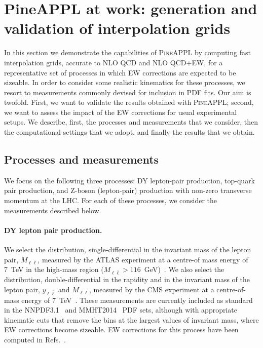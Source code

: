 \section{PineAPPL at work: generation and validation of interpolation grids}
\label{sec:results}

In this section we demonstrate the capabilities of \textsc{PineAPPL} by
computing fast interpolation grids, accurate to NLO QCD and NLO QCD+EW,
for a representative set of processes in which EW corrections are expected 
to be sizeable. In order to consider some realistic kinematics for these
processes, we resort to measurements commonly devised for inclusion in PDF
fits. Our aim is twofold. First, we want to validate the results
obtained with \textsc{PineAPPL}; second, we want to assess the
impact of the EW corrections for usual experimental setups. We describe, first,
the processes and measurements that we consider, then the computational
settings that we adopt, and finally the results that we obtain.

\subsection{Processes and measurements}
\label{subsec:processes_and_measurements}

We focus on the following three processes: DY lepton-pair production, top-quark
pair production, and Z-boson (lepton-pair) production with non-zero transverse
momentum at the LHC. For each of these processes, we consider the measurements
described below.

\paragraph{DY lepton pair production.}
We select the distribution, single-differential in the invariant mass of the
lepton pair, $M_{\ell \bar\ell}$, measured by the ATLAS experiment at a centre-of
mass energy of 7~TeV in the high-mass region
($M_{\ell\bar\ell}>116$~GeV)~\cite{Aad:2013iua}.
We also select the distribution, double-differential in the rapidity and in
the invariant mass of the lepton pair, $y_{\ell\bar\ell}$ and $M_{\ell\bar\ell}$,
measured by the CMS experiment at a centre-of-mass energy of
7~TeV~\cite{Chatrchyan:2013tia}.
These measurements are currently included as standard in the
NNPDF3.1~\cite{Ball:2017nwa} and MMHT2014~\cite{Harland-Lang:2014zoa} PDF sets,
although with appropriate kinematic cuts that remove the bins at the largest
values of invariant mass, where EW corrections become sizeable. EW corrections for this process
have been computed in Refs.~\cite{Baur:2001ze,Dittmaier:2009cr}.


